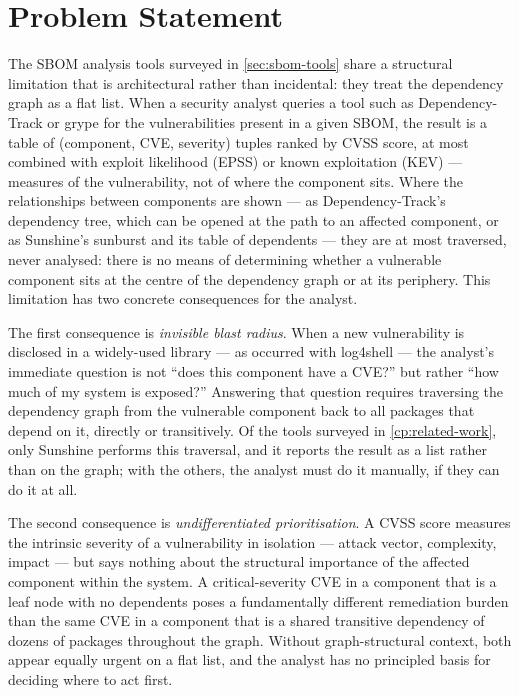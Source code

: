 \section{Problem Statement}
\label{sec:problem-statement}

The SBOM analysis tools surveyed in \autoref{sec:sbom-tools} share a structural limitation that is architectural rather than incidental: they treat the dependency graph as a flat list. When a security analyst queries a tool such as Dependency-Track or grype for the vulnerabilities present in a given SBOM, the result is a table of (component, CVE, severity) tuples ranked by CVSS score, at most combined with exploit likelihood (EPSS) or known exploitation (KEV) --- measures of the vulnerability, not of where the component sits. Where the relationships between components are shown --- as Dependency-Track's dependency tree, which can be opened at the path to an affected component, or as Sunshine's sunburst and its table of dependents --- they are at most traversed, never analysed: there is no means of determining whether a vulnerable component sits at the centre of the dependency graph or at its periphery. This limitation has two concrete consequences for the analyst.

The first consequence is \textit{invisible blast radius}. When a new vulnerability is disclosed in a widely-used library --- as occurred with log4shell --- the analyst's immediate question is not ``does this component have a CVE?'' but rather ``how much of my system is exposed?'' Answering that question requires traversing the dependency graph from the vulnerable component back to all packages that depend on it, directly or transitively. Of the tools surveyed in \autoref{cp:related-work}, only Sunshine performs this traversal, and it reports the result as a list rather than on the graph; with the others, the analyst must do it manually, if they can do it at all.

The second consequence is \textit{undifferentiated prioritisation}. A CVSS score measures the intrinsic severity of a vulnerability in isolation --- attack vector, complexity, impact --- but says nothing about the structural importance of the affected component within the system. A critical-severity CVE in a component that is a leaf node with no dependents poses a fundamentally different remediation burden than the same CVE in a component that is a shared transitive dependency of dozens of packages throughout the graph. Without graph-structural context, both appear equally urgent on a flat list, and the analyst has no principled basis for deciding where to act first.

